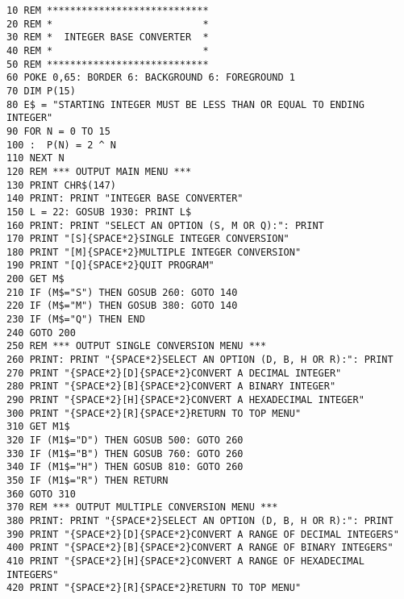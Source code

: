 \begin{tcolorbox}[colback=black,coltext=white]
\verbatimfont{\codefont}
\begin{verbatim}
10 REM ****************************
20 REM *                          *
30 REM *  INTEGER BASE CONVERTER  *
40 REM *                          *
50 REM ****************************
60 POKE 0,65: BORDER 6: BACKGROUND 6: FOREGROUND 1
70 DIM P(15)
80 E$ = "STARTING INTEGER MUST BE LESS THAN OR EQUAL TO ENDING INTEGER"
90 FOR N = 0 TO 15
100 :  P(N) = 2 ^ N
110 NEXT N
120 REM *** OUTPUT MAIN MENU ***
130 PRINT CHR$(147)
140 PRINT: PRINT "INTEGER BASE CONVERTER"
150 L = 22: GOSUB 1930: PRINT L$
160 PRINT: PRINT "SELECT AN OPTION (S, M OR Q):": PRINT
170 PRINT "[S]{SPACE*2}SINGLE INTEGER CONVERSION"
180 PRINT "[M]{SPACE*2}MULTIPLE INTEGER CONVERSION"
190 PRINT "[Q]{SPACE*2}QUIT PROGRAM"
200 GET M$
210 IF (M$="S") THEN GOSUB 260: GOTO 140
220 IF (M$="M") THEN GOSUB 380: GOTO 140
230 IF (M$="Q") THEN END
240 GOTO 200
250 REM *** OUTPUT SINGLE CONVERSION MENU ***
260 PRINT: PRINT "{SPACE*2}SELECT AN OPTION (D, B, H OR R):": PRINT
270 PRINT "{SPACE*2}[D]{SPACE*2}CONVERT A DECIMAL INTEGER"
280 PRINT "{SPACE*2}[B]{SPACE*2}CONVERT A BINARY INTEGER"
290 PRINT "{SPACE*2}[H]{SPACE*2}CONVERT A HEXADECIMAL INTEGER"
300 PRINT "{SPACE*2}[R]{SPACE*2}RETURN TO TOP MENU"
310 GET M1$
320 IF (M1$="D") THEN GOSUB 500: GOTO 260
330 IF (M1$="B") THEN GOSUB 760: GOTO 260
340 IF (M1$="H") THEN GOSUB 810: GOTO 260
350 IF (M1$="R") THEN RETURN
360 GOTO 310
370 REM *** OUTPUT MULTIPLE CONVERSION MENU ***
380 PRINT: PRINT "{SPACE*2}SELECT AN OPTION (D, B, H OR R):": PRINT
390 PRINT "{SPACE*2}[D]{SPACE*2}CONVERT A RANGE OF DECIMAL INTEGERS"
400 PRINT "{SPACE*2}[B]{SPACE*2}CONVERT A RANGE OF BINARY INTEGERS"
410 PRINT "{SPACE*2}[H]{SPACE*2}CONVERT A RANGE OF HEXADECIMAL INTEGERS"
420 PRINT "{SPACE*2}[R]{SPACE*2}RETURN TO TOP MENU"
\end{verbatim}
\end{tcolorbox}
